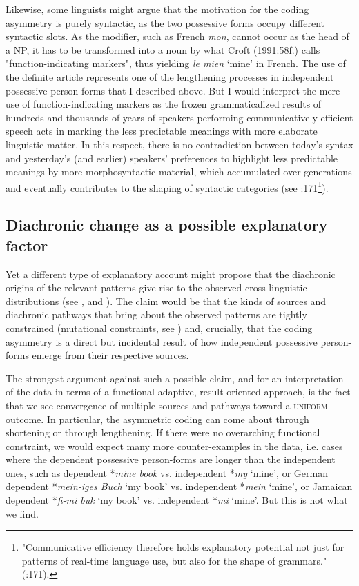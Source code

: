 \documentclass[output=paper]{langsci/langscibook}
\begin{document}
Likewise, some linguists might argue that the motivation for the coding asymmetry is purely syntactic, as the two possessive forms occupy different syntactic slots. As the modifier, such as French \textit{mon}, cannot occur as the head of a NP, it has to be transformed into a noun by what Croft (1991:58f.) calls "function-indicating markers", thus yielding \textit{le mien} `mine' in French. The use of the definite article represents one of the lengthening processes in independent possessive person-forms that I described above. But I would interpret the mere use of function-indicating markers as the frozen grammaticalized results of hundreds and thousands of years of speakers performing communicatively efficient speech acts in marking the less predictable meanings with more elaborate linguistic matter. In this respect, there is no contradiction between today's syntax and yesterday’s (and earlier) speakers' preferences to highlight less predictable meanings by more morphosyntactic material, which accumulated over generations and eventually contributes to the shaping of syntactic categories (see \citealt{NorcliffeJaeger2016}:171\footnote{"Communicative efficiency therefore holds explanatory potential not just for patterns of real-time language use, but also for the shape of grammars." (\citealt{NorcliffeJaeger2016}:171).}). 


\subsection{ Diachronic change as a possible explanatory factor}

Yet a different type of explanatory account might propose that the diachronic origins of the relevant patterns give rise to the observed cross-linguistic distributions (see \citealt{Cristofaro2017}, and \citealt{Cristofaro2019 [this volume]}). The claim would be that the kinds of sources and diachronic pathways that bring about the observed patterns are tightly constrained (mutational constraints, see \citealt{Haspelmath2019 [this volume]}) and, crucially, that the coding asymmetry is a direct but incidental result of how independent possessive person-forms emerge from their respective sources. 

The strongest argument against such a possible claim, and for an interpretation of the data in terms of a functional-adaptive, result-oriented approach, is the fact that we see convergence of multiple sources and pathways toward a \textsc{uniform} outcome. In particular, the asymmetric coding can come about through shortening or through lengthening. If there were no overarching functional constraint, we would expect many more counter-examples in the data, i.e. cases where the dependent possessive person-forms are longer than the independent ones, such as dependent *\textit{mine book} vs. independent *\textit{my} `mine', or German dependent *\textit{mein-iges Buch} `my book' vs. independent *\textit{mein} `mine', or Jamaican dependent *\textit{fi-mi buk} `my book' vs. independent *\textit{mi} `mine'. But this is not what we find.
\end{document}
